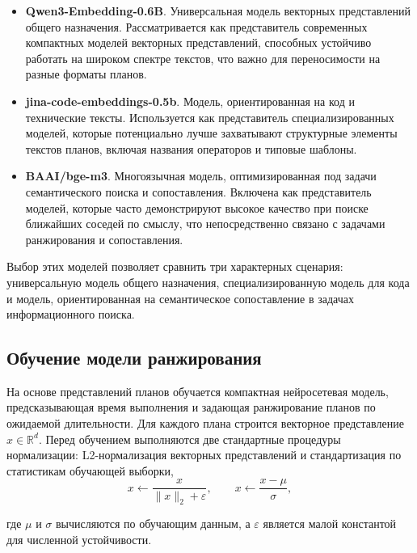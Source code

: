 \begin{itemize}
    \item \textbf{Qwen3-Embedding-0.6B}. Универсальная модель векторных представлений общего назначения. Рассматривается как представитель современных компактных моделей векторных представлений, способных устойчиво работать на широком спектре текстов, что важно для переносимости на разные форматы планов.

    \item \textbf{jina-code-embeddings-0.5b}. Модель, ориентированная на код и технические тексты. Используется как представитель специализированных моделей, которые потенциально лучше захватывают структурные элементы текстов планов, включая названия операторов и типовые шаблоны.

    \item \textbf{BAAI/bge-m3}. Многоязычная модель, оптимизированная под задачи семантического поиска и сопоставления. Включена как представитель моделей, которые часто демонстрируют высокое качество при поиске ближайших соседей по смыслу, что непосредственно связано с задачами ранжирования и сопоставления.
\end{itemize}

Выбор этих моделей позволяет сравнить три характерных сценария: универсальную модель общего назначения, специализированную модель для кода и модель, ориентированная на семантическое сопоставление в задачах информационного поиска.

\subsection{Обучение модели ранжирования}
\label{subsec:ranking_training}

На основе представлений планов обучается компактная нейросетевая модель, предсказывающая время выполнения и задающая ранжирование планов по ожидаемой длительности. Для каждого плана строится векторное представление \(x \in \mathbb{R}^d\). Перед обучением выполняются две стандартные процедуры нормализации: L2-нормализация векторных представлений и стандартизация по статистикам обучающей выборки,
\begin{equation}
  x \leftarrow \frac{x}{\lVert x\rVert_2 + \varepsilon}, \qquad
  x \leftarrow \frac{x - \mu}{\sigma},
\end{equation}

где \(\mu\) и \(\sigma\) вычисляются по обучающим данным, а \(\varepsilon\) является малой константой для численной устойчивости.

